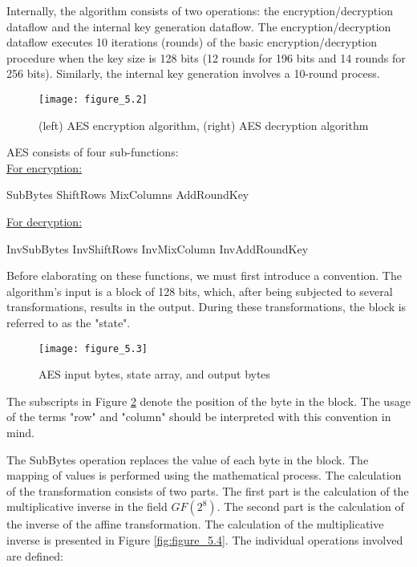 Internally, the algorithm consists of two operations: the encryption/decryption dataflow and the internal key generation dataflow. The encryption/decryption dataflow executes 10 iterations (rounds) of the basic encryption/decryption procedure when the key size is 128 bits (12 rounds for 196 bits and 14 rounds for 256 bits). Similarly, the internal key generation involves a 10-round process.
\begin{figure}
\centering
\texttt{[image: figure\_5.2]}\\
\caption{ (left) AES encryption algorithm, (right) AES decryption algorithm }
\label{fig:figure_5.2}
\end{figure}
AES consists of four sub-functions:\\
\underline{For encryption:}
\begin{outline}
\1 SubBytes
\1 ShiftRows
\1 MixColumns
\1 AddRoundKey
\end{outline}

\noindent\underline{For decryption:}
\begin{outline}
\1 InvSubBytes
\1 InvShiftRows
\1 InvMixColumn
\1 InvAddRoundKey
\end{outline}

Before elaborating on these functions, we must first introduce a convention. The algorithm's input is a block of 128 bits, which, after being subjected to several transformations, results in the output. During these transformations, the block is referred to as the "state".

\begin{figure}
\centering
\texttt{[image: figure\_5.3]}\\
\caption{ AES input bytes, state array, and output bytes}
\label{fig:figure_5.3}
\end{figure}

The subscripts in Figure \ref{fig:figure_5.3} denote the position of the byte in the block. The usage of the terms "row" and "column" should be interpreted with this convention in mind.

The SubBytes operation replaces the value of each byte in the block. The mapping of values is performed using the mathematical process. The calculation of the transformation consists of two parts. The first part is the calculation of the multiplicative inverse in the field $GF(2^8)$. The second part is the calculation of the inverse of the affine transformation. The calculation of the multiplicative inverse is presented in Figure \ref{fig:figure_5.4}. The individual operations involved are defined:\\

